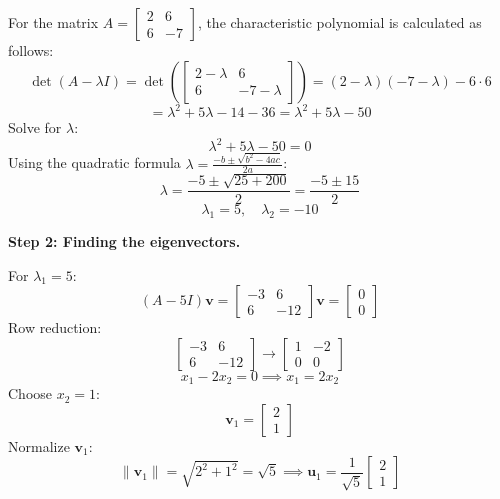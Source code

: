 \documentclass[12pt]{article}
\begin{document}
For the matrix \(A = \begin{bmatrix} 2 & 6 \\ 6 & -7 \end{bmatrix}\), the characteristic polynomial is calculated as follows:
\[
\det(A - \lambda I) = \det\left( \begin{bmatrix} 2-\lambda & 6 \\ 6 & -7-\lambda \end{bmatrix} \right) = (2-\lambda)(-7-\lambda) - 6 \cdot 6
\]
\[
= \lambda^2 + 5\lambda - 14 - 36 = \lambda^2 + 5\lambda - 50
\]
Solve for \(\lambda\):
\[
\lambda^2 + 5\lambda - 50 = 0
\]
Using the quadratic formula \(\lambda = \frac{-b \pm \sqrt{b^2 - 4ac}}{2a}\):
\[
\lambda = \frac{-5 \pm \sqrt{25 + 200}}{2} = \frac{-5 \pm 15}{2}
\]
\[
\lambda_1 = 5, \quad \lambda_2 = -10
\]

\textbf{Step 2: Finding the eigenvectors.}

For \(\lambda_1 = 5\):
\[
(A - 5I)\mathbf{v} = \begin{bmatrix} -3 & 6 \\ 6 & -12 \end{bmatrix}\mathbf{v} = \begin{bmatrix} 0 \\ 0 \end{bmatrix}
\]
Row reduction:
\[
\begin{bmatrix} -3 & 6 \\ 6 & -12 \end{bmatrix} \rightarrow \begin{bmatrix} 1 & -2 \\ 0 & 0 \end{bmatrix}
\]
\[
x_1 - 2x_2 = 0 \implies x_1 = 2x_2
\]
Choose \(x_2 = 1\):
\[
\mathbf{v}_1 = \begin{bmatrix} 2 \\ 1 \end{bmatrix}
\]
Normalize \(\mathbf{v}_1\):
\[
\|\mathbf{v}_1\| = \sqrt{2^2 + 1^2} = \sqrt{5} \implies \mathbf{u}_1 = \frac{1}{\sqrt{5}}\begin{bmatrix} 2 \\ 1 \end{bmatrix}
\]
\end{document}
